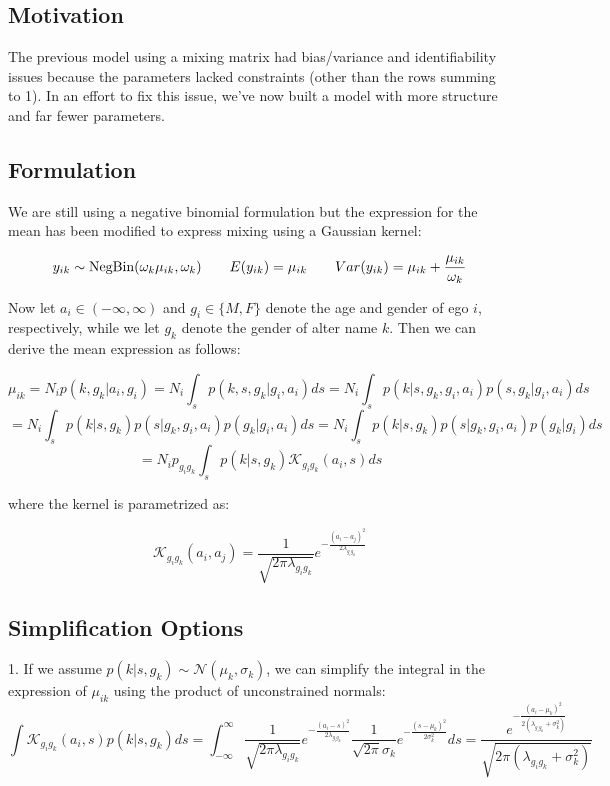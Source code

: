 \documentclass[12pt]{article}
\begin{document}

\def\ci{\perp\!\!\!\perp}
\def\ex{\mathbb{E}}
\def\prob{\mathbb{P}}
\def\ind{\mathbb{I}}
\def\grad{\triangledown}
\def\bigo{\mathcal{O}}

\subsection*{Motivation}
The previous model using a mixing matrix had bias/variance and identifiability issues because the parameters lacked constraints (other than the rows summing to 1). In an effort to fix this issue, we've now built a model with more structure and far fewer parameters.

\subsection*{Formulation}
We are still using a negative binomial formulation but the expression for the mean has been modified to express mixing using a Gaussian kernel:

$$ y_{ik} \sim \text{NegBin}(\omega_k \mu_{ik}, \omega_k)
\hspace{20 pt} E(y_{ik}) = \mu_{ik} 
\hspace{20 pt} Var(y_{ik}) = \mu_{ik} + \frac{\mu_{ik}}{\omega_k}$$

\noindent  Now let $a_i \in (-\infty,\infty)$ and $g_i \in \{M,F\}$ denote the age and gender of ego $i$, respectively, while we let $g_k$ denote the gender of alter name $k$. Then we can derive the mean expression as follows:

$$ \mu_{ik} = N_i p(k, g_k | a_i,g_i)
= N_i \int_s p(k, s, g_k | g_i, a_i) ds
= N_i \int_s p(k | s, g_k, g_i, a_i) p(s, g_k | g_i, a_i) ds $$
$$ = N_i \int_s p(k | s, g_k) p(s | g_k, g_i, a_i) p(g_k | g_i, a_i) ds
= N_i \int_s p(k | s, g_k) p(s | g_k, g_i, a_i) p(g_k | g_i) ds $$
$$ = N_i p_{g_ig_k} \int_s p(k | s, g_k) \mathcal{K}_{g_ig_k}(a_i, s) ds$$

\noindent where the kernel is parametrized as:

$$ \mathcal{K}_{g_ig_k}(a_i, a_j) = \frac{1}{\sqrt{2\pi\lambda_{g_ig_k}}} e^{-\frac{(a_i-a_j)^2}{2\lambda_{g_ig_k}}} $$

\subsection*{Simplification Options}
1. If we assume $p(k | s, g_k) \sim \mathcal{N}(\mu_{k}, \sigma_{k})$, we can simplify the integral in the expression of $\mu_{ik}$ using the product of unconstrained normals:
$$ \int \mathcal{K}_{g_ig_k}(a_i, s) p(k | s, g_k) ds
=  \int_{-\infty}^{\infty} \frac{1}{\sqrt{2\pi\lambda_{g_ig_k}}} e^{-\frac{(a_i-s)^2}{2\lambda_{g_ig_k}}} \frac{1}{\sqrt{2\pi}\sigma_{k}} e^{-\frac{(s-\mu_k)^2}{2\sigma_{k}^2}}ds 
= \frac{ e^{-\frac{(a_i-\mu_k)^2}{2(\lambda_{g_ig_k}+\sigma_{k}^2)}} }{\sqrt{2\pi(\lambda_{g_ig_k} + \sigma_{k}^2)}} $$
\end{document}
